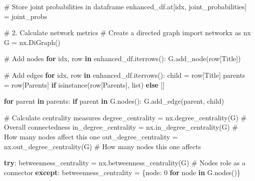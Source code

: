 \documentclass[
  11pt,
  letterpaper,
]{book}
\newenvironment{Shaded}{\begin{snugshade}}{\end{snugshade}}
\newcommand{\BuiltInTok}[1]{\textcolor[rgb]{0.00,0.23,0.31}{#1}}
\newcommand{\CommentTok}[1]{\textcolor[rgb]{0.37,0.37,0.37}{#1}}
\newcommand{\ControlFlowTok}[1]{\textcolor[rgb]{0.00,0.23,0.31}{\textbf{#1}}}
\newcommand{\DecValTok}[1]{\textcolor[rgb]{0.68,0.00,0.00}{#1}}
\newcommand{\ImportTok}[1]{\textcolor[rgb]{0.00,0.46,0.62}{#1}}
\newcommand{\KeywordTok}[1]{\textcolor[rgb]{0.00,0.23,0.31}{\textbf{#1}}}
\newcommand{\NormalTok}[1]{\textcolor[rgb]{0.00,0.23,0.31}{#1}}
\newcommand{\OperatorTok}[1]{\textcolor[rgb]{0.37,0.37,0.37}{#1}}
\newcommand{\StringTok}[1]{\textcolor[rgb]{0.13,0.47,0.30}{#1}}
\begin{document}
\begin{Shaded}
\begin{Highlighting}[]
        \CommentTok{\# Store joint probabilities in dataframe}
\NormalTok{        enhanced\_df.at[idx, }\StringTok{\textquotesingle{}joint\_probabilities\textquotesingle{}}\NormalTok{] }\OperatorTok{=}\NormalTok{ joint\_probs}

    \CommentTok{\# 2. Calculate network metrics}
    \CommentTok{\# Create a directed graph}
    \ImportTok{import}\NormalTok{ networkx }\ImportTok{as}\NormalTok{ nx}
\NormalTok{    G }\OperatorTok{=}\NormalTok{ nx.DiGraph()}

    \CommentTok{\# Add nodes}
    \ControlFlowTok{for}\NormalTok{ idx, row }\KeywordTok{in}\NormalTok{ enhanced\_df.iterrows():}
\NormalTok{        G.add\_node(row[}\StringTok{\textquotesingle{}Title\textquotesingle{}}\NormalTok{])}

    \CommentTok{\# Add edges}
    \ControlFlowTok{for}\NormalTok{ idx, row }\KeywordTok{in}\NormalTok{ enhanced\_df.iterrows():}
\NormalTok{        child }\OperatorTok{=}\NormalTok{ row[}\StringTok{\textquotesingle{}Title\textquotesingle{}}\NormalTok{]}
\NormalTok{        parents }\OperatorTok{=}\NormalTok{ row[}\StringTok{\textquotesingle{}Parents\textquotesingle{}}\NormalTok{] }\ControlFlowTok{if} \BuiltInTok{isinstance}\NormalTok{(row[}\StringTok{\textquotesingle{}Parents\textquotesingle{}}\NormalTok{], }\BuiltInTok{list}\NormalTok{) }\ControlFlowTok{else}\NormalTok{ []}

        \ControlFlowTok{for}\NormalTok{ parent }\KeywordTok{in}\NormalTok{ parents:}
            \ControlFlowTok{if}\NormalTok{ parent }\KeywordTok{in}\NormalTok{ G.nodes():}
\NormalTok{                G.add\_edge(parent, child)}

    \CommentTok{\# Calculate centrality measures}
\NormalTok{    degree\_centrality }\OperatorTok{=}\NormalTok{ nx.degree\_centrality(G)  }\CommentTok{\# Overall connectedness}
\NormalTok{    in\_degree\_centrality }\OperatorTok{=}\NormalTok{ nx.in\_degree\_centrality(G)  }\CommentTok{\# How many nodes affect this one}
\NormalTok{    out\_degree\_centrality }\OperatorTok{=}\NormalTok{ nx.out\_degree\_centrality(G)  }\CommentTok{\# How many nodes this one affects}

    \ControlFlowTok{try}\NormalTok{:}
\NormalTok{        betweenness\_centrality }\OperatorTok{=}\NormalTok{ nx.betweenness\_centrality(G)  }\CommentTok{\# Node\textquotesingle{}s role as a connector}
    \ControlFlowTok{except}\NormalTok{:}
\NormalTok{        betweenness\_centrality }\OperatorTok{=}\NormalTok{ \{node: }\DecValTok{0} \ControlFlowTok{for}\NormalTok{ node }\KeywordTok{in}\NormalTok{ G.nodes()\}}


\end{Highlighting}
\end{Shaded}
\end{document}
